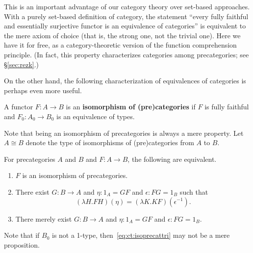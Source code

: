 \documentclass{amsart}
\newcommand{\opp}[1]{\mathord{{#1}^{-1}}}
\newcommand{\map}[2]{\ensuremath{{#1}\left({#2}\right)}\xspace}
\theoremstyle{definition}
\theoremstyle{remark}
\numberwithin{equation}{section}
\begin{document}
This is an important advantage of our category theory over set-based approaches.
With a purely set-based definition of category, the statement ``every fully faithful and essentially surjective functor is an equivalence of categories'' is equivalent to the mere axiom of choice (that is, the strong one, not the trivial one).
Here we have it for free, as a category-theoretic version of the function comprehension principle.
(In fact, this property characterizes categories among precategories; see \S\ref{sec:rezk}.)

On the other hand, the following characterization of equivalences of categories is perhaps even more useful.

\begin{defn}\label{ct:isocat}
  A functor $F:A\to B$ is an \textbf{isomorphism of (pre)categories} if $F$ is fully faithful and $F_0:A_0\to B_0$ is an equivalence of types.
\end{defn}

Note that being an isomorphism of precategories is always a mere property.
Let $A\cong B$ denote the type of isomorphisms of (pre)categories from $A$ to $B$.

\begin{lem}\label{ct:isoprecat}
  For precategories $A$ and $B$ and $F:A\to B$, the following are equivalent.
  \begin{enumerate}
  \item $F$ is an isomorphism of precategories.\label{item:ct:ipc1}
  \item There exist $G:B\to A$ and $\eta:1_A = GF$ and $\epsilon:FG=1_B$ such that\label{item:ct:ipc2}
    \begin{equation}
      \map{(\lambda H. F H)}{\eta} = \map{(\lambda K. K F)}{\opp\epsilon}.\label{eq:ct:isoprecattri}
    \end{equation}
  \item There merely exist $G:B\to A$ and $\eta:1_A = GF$ and $\epsilon:FG=1_B$.\label{item:ct:ipc3}
  \end{enumerate}
\end{lem}

Note that if $B_0$ is not a 1-type, then~\eqref{eq:ct:isoprecattri} may not be a mere proposition.
\end{document}
